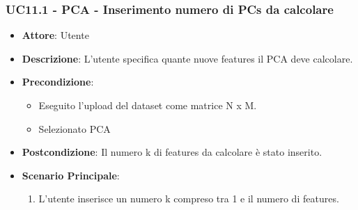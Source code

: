     \subsubsection{UC11.1 - PCA - Inserimento numero di PCs da calcolare}
    \label{uc11.1}
    \begin{itemize}
    \item \textbf{Attore}: Utente
    \item \textbf{Descrizione}: L'utente specifica quante nuove features il PCA deve calcolare.
    \item \textbf{Precondizione}: 
    \begin{itemize}
        \item Eseguito l'upload del dataset come matrice N x M.
        \item Selezionato PCA
    \end{itemize}  
    \item \textbf{Postcondizione}: Il numero k di features da calcolare è stato inserito.
    \item \textbf{Scenario Principale}: 
    \begin{enumerate}
        \item L'utente inserisce un numero k compreso tra 1 e il numero di features.
    \end{enumerate}  
    \end{itemize}
    

